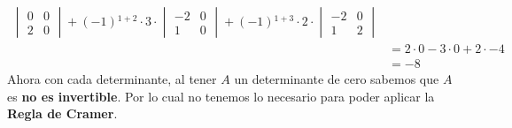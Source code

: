\begin{enumerate}[label=\listAlph]
\[\begin{aligned}
\begin{vmatrix}
                        0 & 0 \\
                        2 & 0
                    \end{vmatrix}
                    + \left(-1\right){}^{1 + 2} \cdot 
                    3 \cdot 
                    \begin{vmatrix}
                        -2 & 0 \\
                        1 & 0
                    \end{vmatrix}
                    +\left(-1\right){}^{1 + 3} \cdot 
                    2 \cdot 
                    \begin{vmatrix}
                        -2 & 0 \\
                        1 & 2
                    \end{vmatrix}
                    \\
                    &=
                    2 \cdot 0
                    -3 \cdot 0
                    +2 \cdot -4
                    \\
                    &= -8
                \end{aligned}
            \]
            Ahora con cada determinante, al tener \(A\) un determinante de cero sabemos que \(A\) es \textbf{no es invertible}. 
            Por lo cual no tenemos lo necesario para poder aplicar la \textbf{Regla de Cramer}.
    \end{enumerate}
